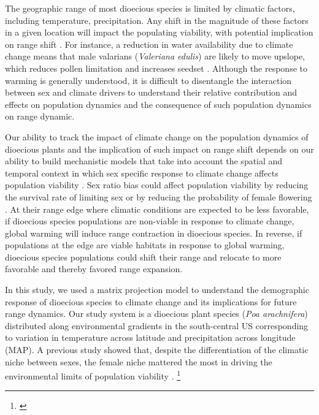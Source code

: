 \documentclass[11pt]{article}
\newcommand{\tom}[2]{{\color{red}{#1}}\footnote{\textit{\color{red}{#2}}}}
\begin{document}
The geographic range of most dioecious species is limited by climatic factors, including temperature, precipitation. 
Any shift in the magnitude of these factors in a given location will impact the populating viability, with potential implication on range shift \citep{davis2001range, pease1989model}. 
For instance, a reduction in water availability due to climate change means that male valarians (\textit{Valeriana edulis}) are likely to move upslope, which reduces pollen limitation and increases seedset \citep{petry2016sex}.
Although the response to warming is generally understood, it is difficult to disentangle the interaction between sex and climate drivers to understand their relative contribution and effects on population dynamics and the consequence of such population dynamics on range dynamic. 

Our ability to track the impact of climate change on the population dynamics of dioecious plants and the implication of such impact on range shift depends on our ability to build mechanistic models that take into account the spatial and temporal context in which sex specific response to climate change affects population viability \citep{davis2001range,evans2016towards,czachura2020demographic}.
Sex ratio bias could affect population viability by reducing the survival rate of limiting sex or by reducing the probability of female flowering \citep{eberhart2017sex,miller2022two}.
At their range edge where climatic conditions are expected to be less favorable, if dioecious species populations are non-viable in response to climate change, global warming will induce range contraction in dioecious species.
In reverse, if populations at the edge are viable habitats in response to global warming, dioecious species populations could shift their range and relocate to more favorable and thereby favored range expansion. 


In this study, we used a matrix projection model to understand the demographic response of dioecious species to climate change and its implications for future range dynamics.
Our study system is a dioecious plant species (\textit{Poa arachnifera}) distributed along environmental gradients in the south-central US corresponding to variation in temperature across latitude and precipitation across longitude (MAP). 
A previous study showed that, despite the differentiation of the climatic niche between sexes, the female niche mattered the most in driving the environmental limits of population viability \citep{miller2022two}. 
\tom{Thus, under current climate conditions, we hypothesized that high temperature and lower precipitation during the growing season have negative effects on population growth rate through a reduction in female growth, survival, and fecundity rate. 
However, that reduction in population growth rate will not go below a viable population (population growth rate less than one) even at range edge. 
Future climate will exacerbate the effect of temperature and precipitation on female vital rates and drive population to extinction, particularly at range edge.}{These hypoheses / predictions are hard to follow. I think it would be helpful to identify 2-3 main questions that this study aims to address and describe these here at the end of the Intro. We could brainstorm these together. }
\end{document}
